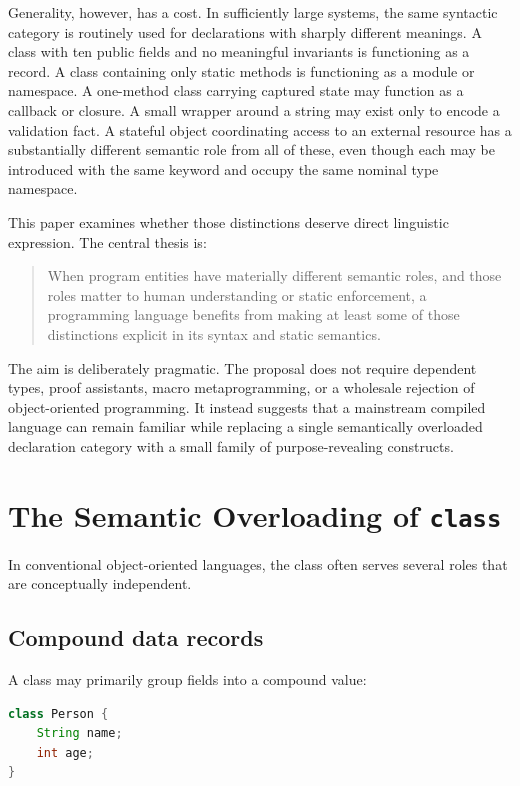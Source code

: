 \documentclass[11pt]{article}
\begin{document}
Generality, however, has a cost. In sufficiently large systems, the same syntactic category is routinely used for declarations with sharply different meanings. A class with ten public fields and no meaningful invariants is functioning as a record. A class containing only static methods is functioning as a module or namespace. A one-method class carrying captured state may function as a callback or closure. A small wrapper around a string may exist only to encode a validation fact. A stateful object coordinating access to an external resource has a substantially different semantic role from all of these, even though each may be introduced with the same keyword and occupy the same nominal type namespace.

This paper examines whether those distinctions deserve direct linguistic expression. The central thesis is:

\begin{quote}
When program entities have materially different semantic roles, and those roles matter to human understanding or static enforcement, a programming language benefits from making at least some of those distinctions explicit in its syntax and static semantics.
\end{quote}

The aim is deliberately pragmatic. The proposal does not require dependent types, proof assistants, macro metaprogramming, or a wholesale rejection of object-oriented programming. It instead suggests that a mainstream compiled language can remain familiar while replacing a single semantically overloaded declaration category with a small family of purpose-revealing constructs.

\section{The Semantic Overloading of \texttt{class}}

In conventional object-oriented languages, the class often serves several roles that are conceptually independent.

\subsection{Compound data records}

A class may primarily group fields into a compound value:

\begin{lstlisting}[language=Java]
class Person {
    String name;
    int age;
}
\end{lstlisting}
\end{document}
